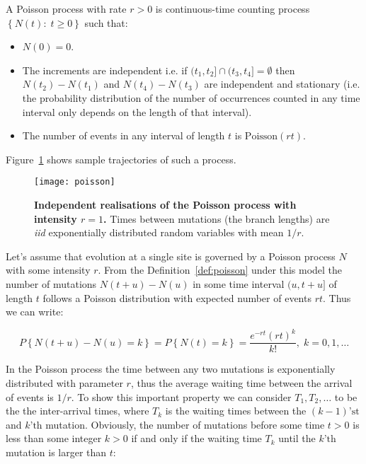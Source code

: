 \begin{definition} 
A Poisson process with rate $r>0$ is continuous-time counting process $\left\{ N(t):\; t\geq0\right\}$ such that:

\begin{itemize}
\item $N(0)=0$.
\item The increments are independent i.e. if $(t_{1},t_{2}]\cap(t_{3},t_{4}]=\emptyset$ then $N(t_2)-N(t_1)$ and $N(t_4)-N(t_3)$ are independent and stationary (i.e. the probability distribution of the number of occurrences counted in any time interval only depends on the length of that interval).
\item The number of events in any interval of length $t$ is $\text{Poisson}(r t)$.
\end{itemize}

Figure~\ref{fig:poisson} shows sample trajectories of such a process.

\label{def:poisson}
\end{definition}

\begin{figure}[H]
\centering
\texttt{[image: poisson]}
\caption{
{ \footnotesize 
{\bf Independent realisations of the Poisson process with intensity $r=1$.}
Times between mutations (the branch lengths) are \emph{iid} exponentially distributed random variables with mean $1/r$.
} %
}
\label{fig:poisson}
\end{figure}

Let's assume that evolution at a single site is governed by a Poisson process $N$ with some intensity $r$.
From the Definition~\ref{def:poisson} under this model the number of mutations $N(t+u)-N(u)$ in some time interval $(u,t+u]$ of length $t$ follows a Poisson distribution with expected number of events $r t$.
Thus we can write:

\begin{equation}
P\left\{ N(t+u)-N(u)=k\right\} =P\left\{ N(t)=k\right\}=\frac{e^{-r t}(r t)^{k}}{k!},\; k=0,1,\ldots
\label{eq:poissonDist} 
\end{equation}

In the Poisson process the time between any two mutations is exponentially distributed with parameter $r$, thus the average waiting time between the arrival of events is $1/r$.
To show this important property we can consider $T_1,T_2,\ldots$ to be the the inter-arrival times, where $T_k$ is the waiting times between the $(k-1)\text{'st}$ and $k\text{'th}$ mutation. 
Obviously, the number of mutations before some time $t>0$ is less than some integer $k>0$ if and only if the waiting time $T_k$ until the $k\text{'th}$ mutation is larger than $t$:

